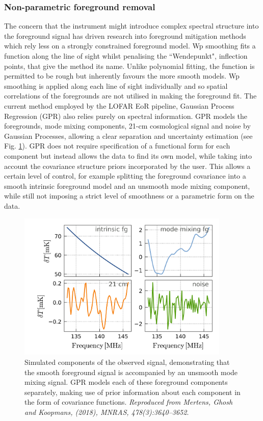 \subsubsection{Non-parametric foreground removal}
\label{sec:nonpar}
The concern that the instrument might introduce complex spectral structure into the foreground signal has driven research into foreground mitigation methods which rely less on a strongly constrained foreground model. Wp smoothing \cite{Harker2009MNRAS.397.1138H} fits a function along the line of sight whilst penalising the ``Wendepunkt", inflection points, that give the method its name. Unlike polynomial fitting, the function is permitted to be rough but inherently favours the more smooth models. Wp smoothing is applied along each line of sight individually and so spatial correlations of the foregrounds are not utilised in making the foreground fit. The current method employed by the LOFAR EoR pipeline, Gaussian Process Regression (GPR) \cite{Mertens2018MNRAS.478.3640M} also relies purely on spectral information. GPR models the foregrounds, mode mixing components, 21-cm cosmological signal and noise by Gaussian Processes, allowing a clear separation and uncertainty estimation (see Fig. \ref{fig:mertens_comp}). GPR does not require specification of a functional form for each component but instead allows the data to find its own model, while taking into account the covariance structure priors incorporated by the user. This allows a certain level of control, for example splitting the foreground covariance into a smooth intrinsic foreground model and an unsmooth mode mixing component, while still not imposing a strict level of smoothness or a parametric form on the data. 

\begin{figure}
\begin{center}
    \includegraphics[width=0.9\textwidth]{Chapman_Jelic/Images/mertens_components.png}
\end{center}
    \caption{Simulated components of the observed signal, demonstrating that the smooth foreground signal is accompanied by an unsmooth mode mixing signal. GPR models each of these foreground components separately, making use of prior information about each component in the form of covariance functions. \textit{Reproduced from Mertens, Ghosh and Koopmans, (2018), MNRAS, 478(3):3640–3652}.}
    \label{fig:mertens_comp}
\end{figure}

